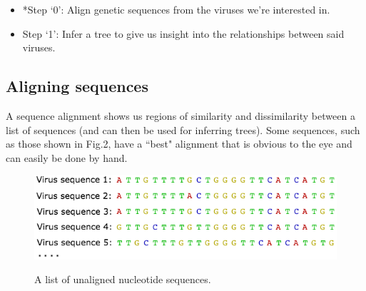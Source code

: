 \documentclass{scrartcl}
\begin{document}

\vspace{2mm}

\begin{itemize}
	\item *Step `0':  Align genetic sequences from the viruses we're interested in.
	\item \hspace{0.5mm} Step `1':  Infer a tree to give us insight into the relationships between said viruses.
\end{itemize}



\subsection{Aligning sequences}

A sequence alignment shows us regions of similarity and dissimilarity between a list of sequences (and can then be used for inferring trees).
Some sequences, such as those shown in Fig.2, have a ``best" alignment that is obvious to the eye and can easily be done by hand.

\begin{figure}[H] 
\center
{\includegraphics[width=0.7\linewidth]{FluSequence0.png}}
\caption{A list of unaligned nucleotide sequences.}
\label{sequences}
\end{figure}
\end{document}
